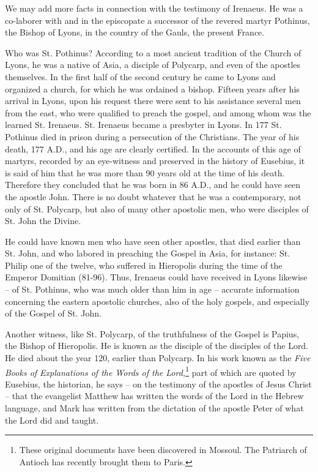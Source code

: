 We may add more facts in connection with the testimony of Irenaeus. He was a co-laborer with and in the episcopate a successor of the revered martyr Pothinus, the Bishop of Lyons, in the country of the Gauls, the present France.

Who was St. Pothinus? According to a most ancient tradition of the Church of Lyons, he was a native of Asia, a disciple of Polycarp, and even of the apostles themselves. In the first half of the second century he came to Lyons and organized a church, for which he was ordained a bishop. Fifteen years after his arrival in Lyons, upon his request there were sent to his assistance several men from the east, who were qualified to preach the gospel, and among whom was the learned St. Irenaeus. St. Irenaeus became a presbyter in Lyons. In 177 St. Pothinus died in prison during a persecution of the Christians. The year of his death, 177 A.D., and his age are clearly certified. In the accounts of this age of martyrs, recorded by an eye-witness and preserved in the history of Eusebius, it is said of him that he was more than 90 years old at the time of his death. Therefore they concluded that he was born in 86 A.D., and he could have seen the apostle John. There is no doubt whatever that he was a contemporary, not only of St. Polycarp, but also of many other apostolic men, who were disciples of St. John the Divine.

He could have known men who have seen other apostles, that died earlier than St. John, and who labored in preaching the Gospel in Asia, for instance: St. Philip one of the twelve, who suffered in Hieropolis during the time of the Emperor Domitian (81-96). Thus, Irenaeus could have received in Lyons likewise -- of St. Pothinus, who was much older than him in age -- accurate information concerning the eastern apostolic churches, also of the holy gospels, and especially of the Gospel of St. John.

Another witness, like St. Polycarp, of the truthfulness of the Gospel is Papius, the Bishop of Hieropolis. He is known as the disciple of the disciples of the Lord. He died about the year 120, earlier than Polycarp. In his work known as the \textit{Five Books of Explanations of the Words of the Lord,}\footnote{These original documents have been discovered in Mossoul. The Patriarch of Antioch has recently brought them to Paris.} part of which are quoted by Eusebius, the historian, he says -- on the testimony of the apostles of Jesus Christ -- that the evangelist Matthew has written the words of the Lord in the Hebrew language, and Mark has written from the dictation of the apostle Peter of what the Lord did and taught.

